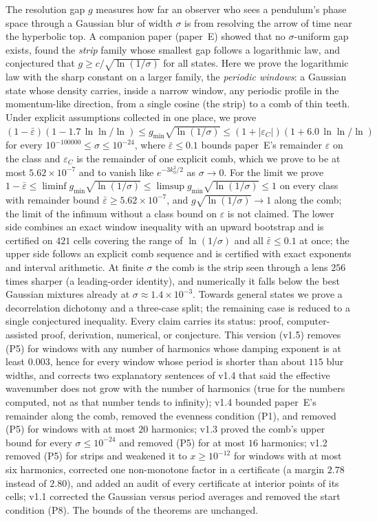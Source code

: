 The resolution gap $g$ measures how far an observer who sees a pendulum's phase space through a Gaussian blur of width $\sigma$ is from
resolving the arrow of time near the hyperbolic top. A companion paper (paper~E) showed that no $\sigma$-uniform gap exists, found the
\emph{strip} family whose smallest gap follows a logarithmic law, and conjectured that $g\ge c/\sqrt{\ln(1/\sigma)}$ for all states.
Here we prove the logarithmic law with the sharp constant on a larger family, the \emph{periodic windows}: a Gaussian state whose density
carries, inside a narrow window, any periodic profile in the momentum-like direction, from a single cosine (the strip) to a comb of
thin teeth. Under explicit assumptions collected in one place, we prove
$(1-\bar\varepsilon)(1-1.7\,\ln\ln/\ln)\le g_{\min}\sqrt{\ln(1/\sigma)}\le(1+|\varepsilon_C|)(1+6.0\,\ln\ln/\ln)$ for every
$10^{-100000}\le\sigma\le10^{-24}$, where $\bar\varepsilon\le0.1$ bounds paper~E's remainder $\varepsilon$ on the class and $\varepsilon_C$ is the remainder of one
explicit comb, which we prove to be at most $5.62\times10^{-7}$ and to vanish like $e^{-3k_0^2/2}$ as $\sigma\to0$. For the limit we prove $1-\bar\varepsilon\le\liminf g_{\min}\sqrt{\ln(1/\sigma)}\le\limsup g_{\min}\sqrt{\ln(1/\sigma)}\le1$ on every class with remainder bound $\bar\varepsilon\ge5.62\times10^{-7}$, and $g\sqrt{\ln(1/\sigma)}\to1$ along the comb; the limit of the infimum without a class bound on $\varepsilon$ is not claimed.
The lower side combines an exact window inequality with an upward bootstrap and is certified on $421$ cells covering the range of $\ln(1/\sigma)$
and all $\bar\varepsilon\le0.1$ at once; the upper side follows an explicit comb sequence and is certified with exact exponents and interval arithmetic. At finite $\sigma$ the comb is the strip seen through
a lens $256$ times sharper (a leading-order identity), and numerically it falls below the best Gaussian mixtures already at
$\sigma\approx1.4\times10^{-3}$. Towards general states we prove a decorrelation dichotomy and a three-case split; the remaining case is
reduced to a single conjectured inequality. Every claim carries its status: proof, computer-assisted proof, derivation, numerical, or conjecture.
This version (v1.5) removes (P5) for windows with any number of harmonics whose damping exponent is at least $0.003$, hence for every window whose period is shorter than about $115$ blur widths, and corrects two explanatory sentences of v1.4 that said the effective wavenumber does not grow with the number of harmonics (true for the numbers computed, not as that number tends to infinity); v1.4 bounded paper~E's remainder along the comb, removed the evenness condition (P1), and removed (P5) for windows with at most $20$ harmonics; v1.3 proved the comb's upper bound for every $\sigma\le10^{-24}$ and removed (P5) for at most $16$ harmonics; v1.2 removed (P5) for strips and weakened it to $x\ge10^{-12}$ for windows with at most six harmonics, corrected one non-monotone factor in a certificate (a margin $2.78$ instead of $2.80$), and added an audit of every certificate at interior points of its cells; v1.1 corrected the Gaussian versus period averages and removed the start condition (P8). The bounds of the theorems are unchanged.
